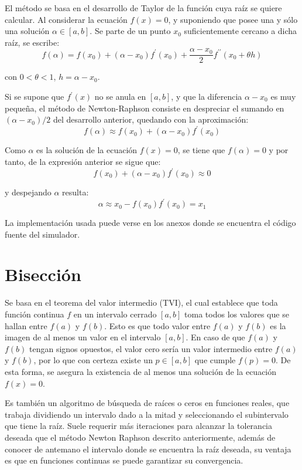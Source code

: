\par El método se basa en el desarrollo de Taylor de la función cuya raíz se quiere calcular. Al considerar la ecuación $f(x)=0$, y suponiendo que posee una y sólo una solución $\alpha\in[a,b]$. Se parte de un punto $x_0$ suficientemente cercano a dicha raíz, se escribe:
\begin{equation*}
f(\alpha) = f(x_0)
    + (\alpha-x_0)f^\prime(x_0) 
    + \frac{\alpha-x_0}{2}f^{\prime\prime}(x_0+\theta h)
\end{equation*}
\par con $0<\theta<1$, $h=\alpha-x_0$.
\par Si se supone que $f^\prime(x)$ no se anula en $[a,b]$, y que la diferencia $\alpha-x_0$ es muy pequeña, el método de Newton-Raphson consiste en despreciar el sumando en $(\alpha-x_0)/2$ del desarrollo anterior, quedando con la aproximación:
\begin{equation*}
f(\alpha) \approx f(x_0) + (\alpha-x_0)f^\prime(x_0)
\end{equation*}
\par Como $\alpha$ es la solución de la ecuación $f(x)=0$, se tiene que $f(\alpha)=0$ y por tanto, de la expresión anterior se sigue que:
\begin{equation*}
f(x_0)+(\alpha-x_0)f^\prime(x_0) \approx 0
\end{equation*}
\par y despejando $\alpha$ resulta:
\begin{equation*}
\alpha \approx x_0 - f(x_0)f^\prime(x_0) = x_1
\end{equation*}
\par La implementación usada puede verse en los anexos donde se encuentra el código fuente del simulador.

\section{Bisección}
\par Se basa en el teorema del valor intermedio (TVI), el cual establece que toda función continua $f$ en un intervalo cerrado $[a,b]$ toma todos los valores que se hallan entre $f(a)$ y $f(b)$. Esto es que todo valor entre $f(a)$ y $f(b)$ es la imagen de al menos un valor en el intervalo $[a,b]$. En caso de que $f(a)$ y $f(b)$ tengan signos opuestos, el valor cero sería un valor intermedio entre $f(a)$ y $f(b)$, por lo que con certeza existe un  $p\in [a,b]$ que cumple  $f(p)=0$. De esta forma, se asegura la existencia de al menos una solución de la ecuación $f(x)=0$.
\par Es también un algoritmo de búsqueda de raíces o ceros en funciones reales, que trabaja dividiendo un intervalo dado a la mitad y seleccionando el subintervalo que tiene la raíz. Suele requerir más iteraciones para alcanzar la tolerancia deseada que el método Newton Raphson descrito anteriormente, además de conocer de antemano el intervalo donde se encuentra la raíz deseada, su ventaja es que en funciones continuas se puede garantizar su convergencia.
